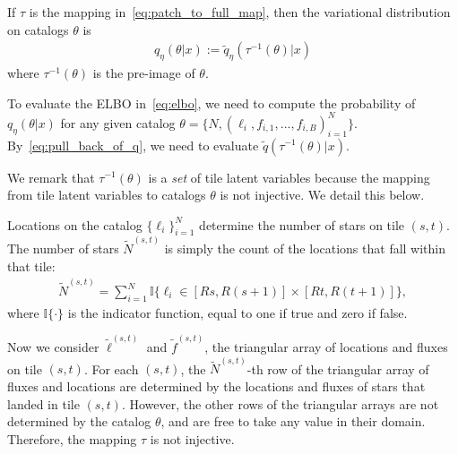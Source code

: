 If $\tau$ is the mapping in~\eqref{eq:patch_to_full_map}, then the variational distribution on catalogs $\theta$ is
\begin{align}
    q_\eta(\theta | x) := \tilde q_\eta(\tau^{-1}(\theta) | x)
    \label{eq:pull_back_of_q}
\end{align}
where $\tau^{-1}(\theta)$ is the pre-image of $\theta$.



\noindent To evaluate
the ELBO in~\eqref{eq:elbo}, 
we need to compute the probability of 
$q_\eta(\theta | x)$
for any given catalog $\theta = \{N, (\ell_i, f_{i,1}, ..., f_{i,B})_{i = 1}^N\}$. By~\eqref{eq:pull_back_of_q}, 
we need to evaluate $\tilde q(\tau^{-1}(\theta) | x)$. 

We remark that $\tau^{-1}(\theta)$ is a {\itshape set} of tile latent variables because the mapping from tile latent variables to catalogs $\theta$ is not injective. We detail this below. 

Locations on the catalog $\{\ell_i\}_{i=1}^N$
determine the number of stars on tile $(s,t)$. 
The number of stars $\tilde N^{(s,t)}$ is simply the count of the locations that fall within that tile:
\begin{align}
\tilde N^{(s,t)} = \sum_{i=1}^N 
\mathbb{I}\Big\{\ell_i\in [Rs, R(s+1)] \times [Rt, R(t+1)]\Big\},
\end{align}
where $\mathbb{I}\{\cdot\}$ is the indicator function, equal to one if true and zero if false.

Now we consider $\tilde\ell^{(s, t)}$ and $\tilde f^{(s, t)}$, the triangular array of locations and fluxes on tile $(s,t)$. 
For each $(s,t)$, the $\tilde N^{(s,t)}$-th row 
of the triangular array of fluxes and locations are 
determined by the locations and fluxes of stars that landed in tile $(s,t)$. However, the other rows 
of the triangular arrays are not determined by 
the catalog $\theta$, and are free to take any value in their domain. Therefore, the mapping $\tau$ is not injective. 

